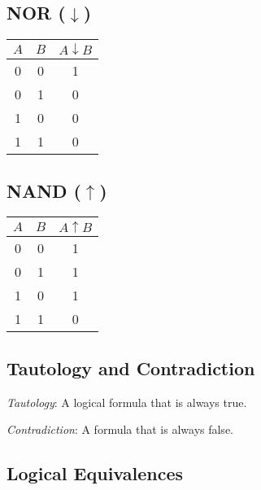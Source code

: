 \begin{multicols}{2}
	\vspace{1em}

	\subsection*{NOR (\(\downarrow\))}

	\begin{tabular}{ccc}
		\toprule
		\(A\) & \(B\) & \(A \downarrow B\) \\
		\midrule
		0   & 0   & 1                \\
		0   & 1   & 0                \\
		1   & 0   & 0                \\
		1   & 1   & 0                \\
		\bottomrule
	\end{tabular}

	\vspace{1em}

	\subsection*{NAND (\(\uparrow\))}

	\begin{tabular}{ccc}
		\toprule
		\(A\) & \(B\) & \(A \uparrow B\) \\
		\midrule
		0   & 0   & 1              \\
		0   & 1   & 1              \\
		1   & 0   & 1              \\
		1   & 1   & 0              \\
		\bottomrule
	\end{tabular}

\end{multicols}
\medskip

\subsection{Tautology and Contradiction}

\emph{Tautology}: A logical formula that is always true.

\emph{Contradiction}: A formula that is always false.

\newpage

\subsection{Logical Equivalences}

